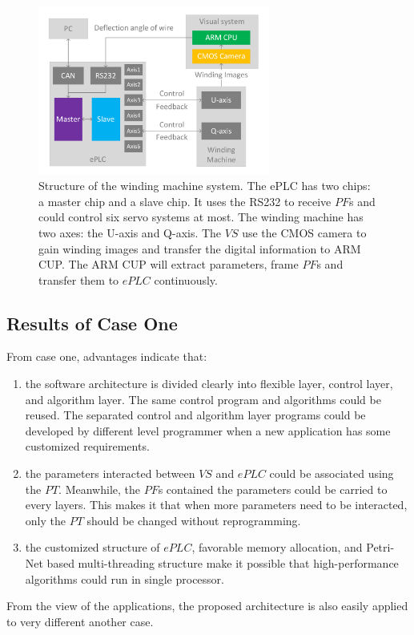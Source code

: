 \documentclass[journal,UTF8]{IEEEtran}
\begin{document}
\begin{figure}
	\centering
	\includegraphics[width=3in]{fig/WindingSystem.pdf}
	\caption{ Structure of the winding machine system. The ePLC has two chips: a master chip and a slave chip. It uses the RS232 to receive $PF$s and could control six servo systems at most. The winding machine has two axes: the U-axis and Q-axis. The $VS$ use the CMOS camera to gain winding images and transfer the digital information to ARM CUP. The ARM CUP will extract parameters, frame $PF$s and transfer them to $ePLC$ continuously.}
	\label{fig:WindingSystem}
\end{figure}

\subsection{Results of Case One}
From case one, advantages indicate that:
\begin{enumerate}
	\item the software architecture is divided clearly into flexible layer, control layer, and algorithm layer. The same control program and algorithms could be reused. The separated control and algorithm layer programs could be developed by different level programmer when a new application has some customized requirements.
	\item the parameters interacted between $VS$ and $ePLC$ could be associated using the $PT$. Meanwhile, the $PF$s contained the parameters could be carried to every layers. This makes it that when more parameters need to be interacted, only the $PT$ should be changed without reprogramming.
	\item the customized structure of $ePLC$, favorable memory allocation, and Petri-Net based multi-threading structure make it possible that high-performance algorithms could run in single processor.
\end{enumerate}

From the view of the applications, the proposed architecture is also easily applied to very different another case.
\end{document}
